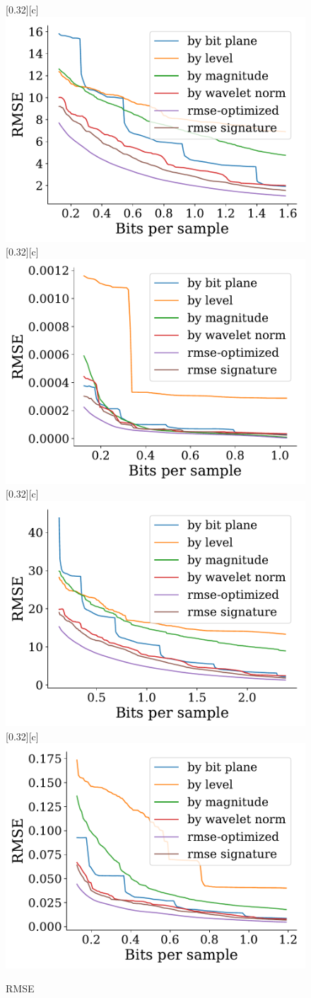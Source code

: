 \documentclass{article}
\begin{document}
\begin{figure}[htb]
        [0.32\linewidth][c]{%
                \includegraphics[width=0.3\linewidth]{img/supplementary/rmse-optimized-vismale}}
        [0.32\linewidth][c]{%
                \includegraphics[width=0.3\linewidth]{img/supplementary/rmse-optimized-karfs}}
        [0.32\linewidth][c]{%
                \includegraphics[width=0.3\linewidth]{img/supplementary/rmse-optimized-aneurism}}
        [0.32\linewidth][c]{%
                \includegraphics[width=0.3\linewidth]{img/supplementary/rmse-optimized-velocityz}}
        \caption{RMSE}
\end{figure}
\end{document}
